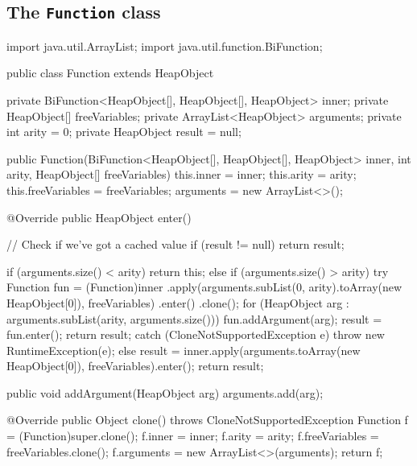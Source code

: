 \documentclass[dissertation.tex]{subfiles}
\begin{document}
\begin{appendices}
\chapter{The \texttt{Function} class}\label{appendix:function}
{
    \begin{javafigure}
import java.util.ArrayList;
import java.util.function.BiFunction;

public class Function extends HeapObject {
    private BiFunction<HeapObject[], HeapObject[], HeapObject> inner;
    private HeapObject[] freeVariables;
    private ArrayList<HeapObject> arguments;
    private int arity = 0;
    private HeapObject result = null;

    public Function(BiFunction<HeapObject[], HeapObject[], HeapObject> inner, int arity, HeapObject[] freeVariables) {
        this.inner = inner;
        this.arity = arity;
        this.freeVariables = freeVariables;
        arguments = new ArrayList<>();
    }

    @Override
    public HeapObject enter() {
        // Check if we've got a cached value
        if (result != null) {
            return result;
        }

        if (arguments.size() < arity) {
            return this;
        }
        else if (arguments.size() > arity) {
            try {
                Function fun = (Function)inner
                    .apply(arguments.subList(0, arity).toArray(new HeapObject[0]), freeVariables)
                    .enter()
                    .clone();
                for (HeapObject arg : arguments.subList(arity, arguments.size()))
                    fun.addArgument(arg);
                result = fun.enter();
                return result;
            }
            catch (CloneNotSupportedException e) {
                throw new RuntimeException(e);
            }
        }
        else {
            result = inner.apply(arguments.toArray(new HeapObject[0]), freeVariables).enter();
            return result;
        }
    }

    public void addArgument(HeapObject arg) {
        arguments.add(arg);
    }

    @Override
    public Object clone() throws CloneNotSupportedException {
        Function f = (Function)super.clone();
        f.inner = inner;
        f.arity = arity;
        f.freeVariables = freeVariables.clone();
        f.arguments = new ArrayList<>(arguments);
        return f;
    }
}
    \end{javafigure}
}
\end{appendices}
\end{document}

